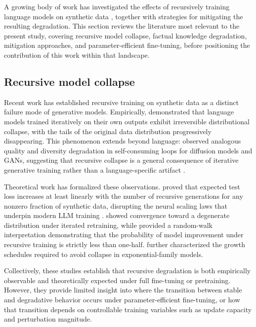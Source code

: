 \documentclass[a4paper,fleqn]{cas-dc}
\begin{document}
A growing body of work has investigated the effects of recursively training
language models on synthetic data \citep{villalobos2024}, together with
strategies for mitigating the resulting degradation. This section reviews the
literature most relevant to the present study, covering recursive model
collapse, factual knowledge degradation, mitigation approaches, and
parameter-efficient fine-tuning, before positioning the contribution of this
work within that landscape.

\subsection{Recursive model collapse}

Recent work has established recursive training on synthetic data as a distinct
failure mode of generative models. Empirically, \citet{shumailov2024}
demonstrated that language models trained iteratively on their own outputs
exhibit irreversible distributional collapse, with the tails of the original
data distribution progressively disappearing. This phenomenon extends beyond
language: \citet{alemohammad2024} observed analogous quality and diversity
degradation in self-consuming loops for diffusion models and GANs, suggesting
that recursive collapse is a general consequence of iterative generative
training rather than a language-specific artifact \citep{guo2024collapse}.

Theoretical work has formalized these observations. \citet{dohmatob2025}
proved that expected test loss increases at least linearly with the number of
recursive generations for any nonzero fraction of synthetic data, disrupting
the neural scaling laws that underpin modern LLM training
\citep{kaplan2020scaling,dohmatob2024scaling}.
\citet{seddik2024} showed convergence toward a degenerate distribution under
iterated retraining, while \citet{xu2025} provided a random-walk interpretation
demonstrating that the probability of model improvement under recursive training
is strictly less than one-half. \citet{dey2024} further characterized the
growth schedules required to avoid collapse in exponential-family models.

Collectively, these studies establish that recursive degradation is both
empirically observable and theoretically expected under full fine-tuning or
pretraining. However, they provide limited insight into where the transition
between stable and degradative behavior occurs under parameter-efficient
fine-tuning, or how that transition depends on controllable training variables
such as update capacity and perturbation magnitude.
\end{document}
